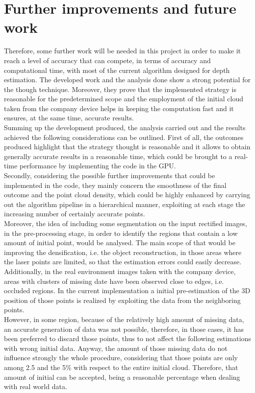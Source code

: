 \section{Further improvements and future work}
\label{section:further-improvements}

Therefore, some further work will be needed in this project in order to make it reach a level of accuracy that can compete, in terms of accuracy and computational time, with most of the current algorithm designed for depth estimation.
The developed work and the analysis done show a strong potential for the though technique.
Moreover, they prove that the implemented strategy is reasonable for the predetermined scope and the employment of the initial cloud taken from the company device helps in keeping the computation fast and it ensures, at the same time, accurate results.\\
Summing up the development produced, the analysis carried out and the results achieved the following considerations can be outlined.
First of all, the outcomes produced highlight that the strategy thought is reasonable and it allows to obtain generally accurate results in a reasonable time, which could be brought to a real-time performance by implementing the code in the GPU. \\
Secondly, considering the possible further improvements that could be implemented in the code, they mainly concern the smoothness of the final outcome and the point cloud density, which could be highly enhanced by carrying out the algorithm pipeline in a hierarchical manner, exploiting at each stage the increasing number of certainly accurate points. \\
Moreover, the idea of including some segmentation on the input rectified images, in the pre-processing stage, in order to identify the regions that contain a low amount of initial point, would be analysed.
The main scope of that would be improving the densification, i.e. the object reconstruction, in those areas where the laser points are limited, so that the estimation errors could easily decrease. 
Additionally, in the real environment images taken with the company device, areas with clusters of missing date have been observed close to edges, i.e. occluded regions. 
In the current implementation a initial pre-estimation of the 3D position of those points is realized by exploiting the data from the neighboring points. \\
However, in some region, because of the relatively high amount of missing data, an accurate generation of data was not possible, therefore, in those cases, it has been preferred to discard those points, thus to not affect the following estimations with wrong initial data.
Anyway, the amount of those missing data do not influence strongly the whole procedure, considering that those points are only among 2.5 and the 5\% with respect to the entire initial cloud. 
Therefore, that amount of initial can be accepted, being a reasonable percentage when dealing with real world data. 
